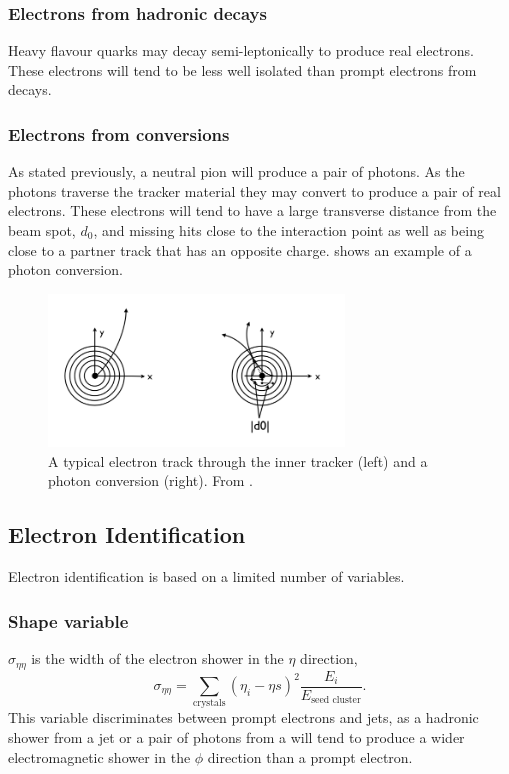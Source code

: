 \subsubsection{Electrons from hadronic decays}
Heavy flavour quarks may decay semi-leptonically to produce real electrons. These
electrons will tend to be less well isolated than prompt electrons from \PW
decays.

\subsubsection{Electrons from conversions}
As stated previously, a neutral pion will produce a pair of photons. As the
photons traverse the tracker material they may convert to produce a pair of real
electrons. These electrons will tend to have a large transverse distance from
the beam spot, $d_0$, and  missing hits close to the interaction point as well as
being close to a partner track that has an opposite charge.
 shows an example of a photon conversion.

\begin{figure}[htbp]
  \centering
  \includegraphics[width=0.7\textwidth]{conversion}
  \caption{A typical electron track through the inner tracker (left) and a
photon conversion (right). From \cite{eConver}.}
  \label{fig:conversion}
\end{figure}

\subsection{Electron Identification}
Electron identification is based on a limited number of variables.

\subsubsection{Shape variable}

$\sigma_{\eta\eta}$ is the width of the electron shower in the $\eta$
direction,
\begin{equation}
\sigma_{\eta\eta} = 
\sum_{\text{crystals}} \left(\eta_{i} - \eta{s}\right)^{2}
\frac{E_{i}}{E_{\text{seed cluster}}}.
\end{equation}
This variable discriminates between prompt electrons and jets, as a hadronic
shower from a jet or a pair of photons from a \Ppizero will tend to produce a
wider electromagnetic shower in the $\phi$ direction than a prompt electron.

